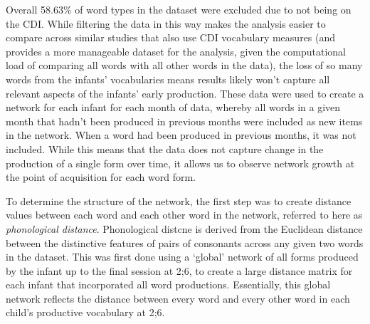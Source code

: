 \documentclass[
  man]{apa6}
\begin{document}
Overall 58.63\% of word types in the dataset were excluded due to not being on the CDI. While filtering the data in this way makes the analysis easier to compare across similar studies that also use CDI vocabulary measures (and provides a more manageable dataset for the analysis, given the computational load of comparing all words with all other words in the data), the loss of so many words from the infants' vocabularies means results likely won't capture all relevant aspects of the infants' early production. These data were used to create a network for each infant for each month of data, whereby all words in a given month that hadn't been produced in previous months were included as new items in the network. When a word had been produced in previous months, it was not included. While this means that the data does not capture change in the production of a single form over time, it allows us to observe network growth at the point of acquisition for each word form.

To determine the structure of the network, the first step was to create distance values between each word and each other word in the network, referred to here as \emph{phonological distance}. Phonological distcne is derived from the Euclidean distance between the distinctive features of pairs of consonants across any given two words in the dataset. This was first done using a `global' network of all forms produced by the infant up to the final session at 2;6, to create a large distance matrix for each infant that incorporated all word productions. Essentially, this global network reflects the distance between every word and every other word in each child's productive vocabulary at 2;6.
\end{document}
